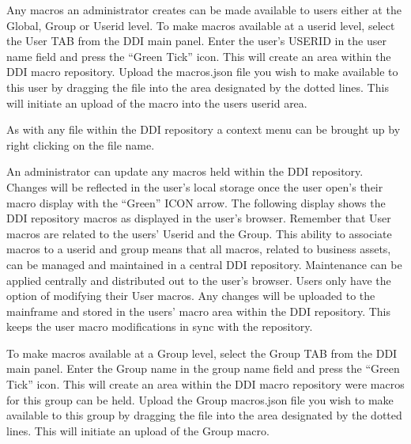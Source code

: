 \documentclass[letterpaper,10pt,english]{sphinxmanual}
\begin{document}


Any macros an administrator creates can be made available to users either at the Global, Group or Userid level. To make macros available at a userid level, select the User TAB from the DDI main panel. Enter the user’s USERID in the user name field and press the “Green Tick” icon. This will create an area within the DDI macro repository. Upload the macros.json file you wish to make available to this user by dragging the file into the area designated by the dotted lines. This will initiate an upload of the macro into the users userid area.



As with any file within the DDI repository a context menu can be brought up by right clicking on the file name.



An administrator can update any macros held within the DDI repository. Changes will be reflected in the user’s local storage once the user open’s their macro display with the “Green” ICON arrow. The following
display shows the DDI repository macros as displayed in the user’s browser. Remember that User macros are related to the users’ Userid and the Group. This ability to associate macros to a userid and group means that all macros, related to business assets, can be managed and maintained in a central DDI repository. Maintenance can be applied centrally and distributed out to the user’s browser. Users only have the
option of modifying their User macros. Any changes will be uploaded to the mainframe and stored in the users’ macro area within the DDI repository. This keeps the user macro modifications in sync with the
repository.




To make macros available at a Group level, select the Group TAB from the DDI main panel. Enter the Group name in the group name field and press the “Green Tick” icon. This will create an area within the DDI macro repository were macros for this group can be held. Upload the Group macros.json file you wish to make available to this group by dragging the file into the area designated by the dotted lines. This will
initiate an upload of the Group macro.
\end{document}
